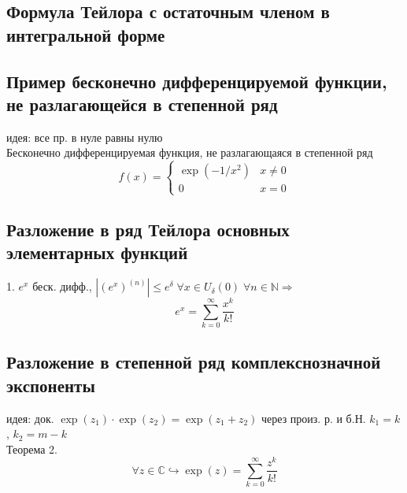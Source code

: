 \documentclass{article}
\begin{document}
\subsection{Формула Тейлора с остаточным членом в интегральной форме}
\subsection{Пример бесконечно дифференцируемой функции, не разлагающейся в степенной ряд}
идея: все пр. в нуле равны нулю \\
Бесконечно дифференцируемая функция, не разлагающаяся в степенной ряд
\begin{equation*}
    f(x) = 
    \begin{cases}
    \exp (-1/x^2) & x \neq 0 \\
    0 & x=0
    \end{cases}
\end{equation*}

\subsection{Разложение в ряд Тейлора основных элементарных функций}
1. $e^x$ беск. дифф., $|(e^x)^{(n)}| \leq e^\delta \; \forall x \in U_\delta (0) \; \forall n \in \mathbb N \Rightarrow$
\begin{equation*}
    e^x = \sum_{k=0}^\infty \frac{x^k}{k!}
\end{equation*}
\subsection{Разложение в степенной ряд комплекснозначной экспоненты}
идея: док. $\exp (z_1) \cdot \exp (z_2) = \exp (z_1+z_2)$ через произ. р. и б.Н. $k_1 = k$, $k_2 = m-k$ \\
Теорема 2.
\begin{equation*}
    \forall z \in \mathbb C \hookrightarrow \exp(z) = \sum_{k=0}^\infty \frac{z^k}{k!}
\end{equation*}
\end{document}
